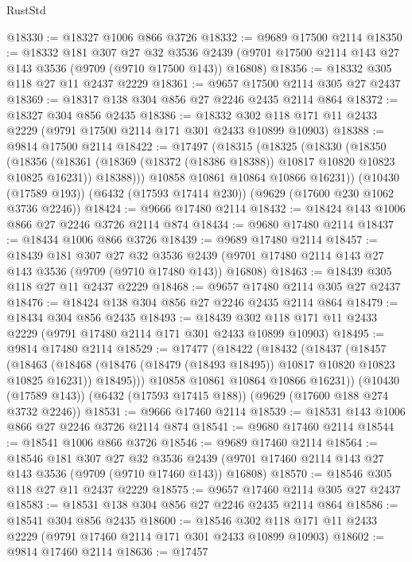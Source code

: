 \begin{lexlean}{RustStd}
\begin{coremodule}
@18330 := @18327 @1006 @866 @3726
@18332 := @9689 @17500 @2114
@18350 := @18332
    @181
    @307
    @27
    @32
    @3536
    @2439
    (@9701 @17500 @2114 @143 @27 @143 @3536 (@9709 (@9710 @17500 @143)) @16808)
@18356 := @18332 @305 @118 @27 @11 @2437 @2229
@18361 := @9657 @17500 @2114 @305 @27 @2437
@18369 := @18317 @138 @304 @856 @27 @2246 @2435 @2114 @864
@18372 := @18327 @304 @856 @2435
@18386 := @18332 @302 @118 @171 @11 @2433 @2229 (@9791 @17500 @2114 @171 @301 @2433 @10899 @10903)
@18388 := @9814 @17500 @2114
@18422 := @17497
    (@18315
      (@18325
        (@18330
          (@18350
            (@18356
              (@18361 (@18369 (@18372 (@18386 @18388)) @10817 @10820 @10823 @10825 @16231))
              @18388)))
        @10858
        @10861
        @10864
        @10866
        @16231))
    (@10430 (@17589 @193))
    (@6432 (@17593 @17414 @230))
    (@9629 (@17600 @230 @1062 @3736 @2246))
@18424 := @9666 @17480 @2114
@18432 := @18424 @143 @1006 @866 @27 @2246 @3726 @2114 @874
@18434 := @9680 @17480 @2114
@18437 := @18434 @1006 @866 @3726
@18439 := @9689 @17480 @2114
@18457 := @18439
    @181
    @307
    @27
    @32
    @3536
    @2439
    (@9701 @17480 @2114 @143 @27 @143 @3536 (@9709 (@9710 @17480 @143)) @16808)
@18463 := @18439 @305 @118 @27 @11 @2437 @2229
@18468 := @9657 @17480 @2114 @305 @27 @2437
@18476 := @18424 @138 @304 @856 @27 @2246 @2435 @2114 @864
@18479 := @18434 @304 @856 @2435
@18493 := @18439 @302 @118 @171 @11 @2433 @2229 (@9791 @17480 @2114 @171 @301 @2433 @10899 @10903)
@18495 := @9814 @17480 @2114
@18529 := @17477
    (@18422
      (@18432
        (@18437
          (@18457
            (@18463
              (@18468 (@18476 (@18479 (@18493 @18495)) @10817 @10820 @10823 @10825 @16231))
              @18495)))
        @10858
        @10861
        @10864
        @10866
        @16231))
    (@10430 (@17589 @143))
    (@6432 (@17593 @17415 @188))
    (@9629 (@17600 @188 @274 @3732 @2246))
@18531 := @9666 @17460 @2114
@18539 := @18531 @143 @1006 @866 @27 @2246 @3726 @2114 @874
@18541 := @9680 @17460 @2114
@18544 := @18541 @1006 @866 @3726
@18546 := @9689 @17460 @2114
@18564 := @18546
    @181
    @307
    @27
    @32
    @3536
    @2439
    (@9701 @17460 @2114 @143 @27 @143 @3536 (@9709 (@9710 @17460 @143)) @16808)
@18570 := @18546 @305 @118 @27 @11 @2437 @2229
@18575 := @9657 @17460 @2114 @305 @27 @2437
@18583 := @18531 @138 @304 @856 @27 @2246 @2435 @2114 @864
@18586 := @18541 @304 @856 @2435
@18600 := @18546 @302 @118 @171 @11 @2433 @2229 (@9791 @17460 @2114 @171 @301 @2433 @10899 @10903)
@18602 := @9814 @17460 @2114
@18636 := @17457

\end{coremodule}
\end{lexlean}
